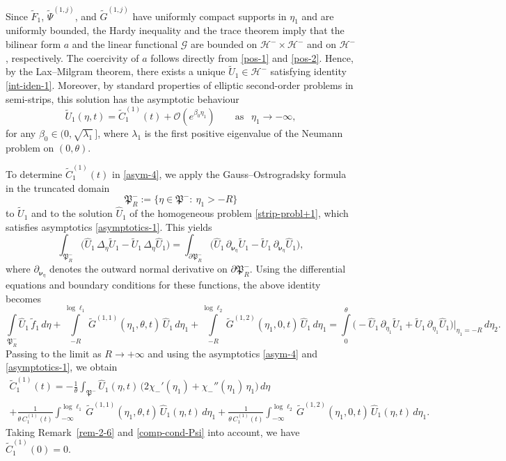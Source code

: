 \documentclass[reqno]{amsart}            %
\numberwithin{equation}{section}
\begin{document}
	Since $\widetilde{F}_1$, $\widetilde{\Psi}^{(1,j)}$, and $\widetilde{G}^{(1,j)}$ have uniformly compact supports in $\eta_1$ and are uniformly bounded, the Hardy inequality and the trace theorem imply that 
	the bilinear form $a$ and the linear functional $\mathcal{G}$ are bounded on $\mathcal{H}^- \times \mathcal{H}^-$ and on $\mathcal{H}^-$, respectively.
	The coercivity of $a$ follows directly from \eqref{pos-1} and \eqref{pos-2}. Hence, by the Lax--Milgram theorem, there exists a unique
	$\widetilde{U}_1 \in \mathcal{H}^-$ satisfying identity \eqref{int-iden-1}. 
	Moreover, by standard properties of elliptic second-order problems in semi-strips, this solution has the asymptotic behaviour
	\begin{equation}\label{asym-4}
		\widetilde{U}_1(\eta,t) = \widetilde{C}^{(1)}_1(t) + \mathcal{O}\!\left(e^{\beta_0 \eta_1}\right)
		\qquad \text{as } \ \ \eta_1 \to -\infty,
	\end{equation}
	for any $\beta_0 \in (0,\sqrt{\lambda_1}\,]$, where $\lambda_1$ is the first positive eigenvalue of the Neumann problem on $(0,\theta)$.
	
	To determine $\widetilde{C}^{(1)}_1(t)$ in \eqref{asym-4}, we apply the Gauss--Ostrogradsky formula in the truncated domain
	$$
	\mathfrak{P}^-_R := \{\eta \in \mathfrak{P}^-\colon \ \eta_1 > - R\}
	$$ 
	to $\widetilde{U}_1$ and to the solution $\widehat{U}_1$ of the homogeneous problem \eqref{strip-probl+1}, which satisfies asymptotics \eqref{asymptotics-1}. This yields
	$$
	\int_{\mathfrak{P}^-_R}\Big(\widehat{U}_1 \, \Delta_\eta\widetilde{U}_1 - \widetilde{U}_1 \, \Delta_\eta\widehat{U}_1\Big) =
	\int_{\partial\mathfrak{P}^-_R}\Big(\widehat{U}_1 \, \partial_{\boldsymbol{\nu}_\eta}\widetilde{U}_1 - \widetilde{U}_1 \, \partial_{\boldsymbol{\nu}_\eta}\widehat{U}_1\Big),
	$$ 
	where $\partial_{\boldsymbol{\nu}_\eta}$ denotes the outward normal derivative on $\partial\mathfrak{P}^-_R$. 
	Using the differential equations and boundary conditions for these functions, the above identity becomes
	$$
	\int\limits_{\mathfrak{P}^-_R} \widehat{U}_1 \, \tilde{f}_1 \, d\eta + \int\limits_{-R}^{\log\ell_1} \widetilde{G}^{(1,1)}(\eta_1,\theta,t) \,  \widehat{U}_1 \, d\eta_1 + \int\limits_{-R}^{\log\ell_2} \widetilde{G}^{(1,2)}(\eta_1,0,t) \,  \widehat{U}_1\, d\eta_1 =
	\int\limits_{0}^{\theta}\Big(-\widehat{U}_1 \, \partial_{\eta_1}\widetilde{U}_1 + \widetilde{U}_1 \, \partial_{\eta_1}\widehat{U}_1\Big)\Big|_{\eta_1=-R} \, d\eta_2.
	$$
	Passing to the limit as $R\to+\infty$ and using the asymptotics \eqref{asym-4} and \eqref{asymptotics-1}, we obtain
	\begin{multline}\label{constant}
		\widetilde{C}^{(1)}_1(t) = -\frac{1}{\theta} \int_{\mathfrak{P}^-} \widehat{U}_1(\eta,t) \, \big(2\chi_-'(\eta_1) + \chi_-''(\eta_1)\,\eta_1\big)\, d\eta 
		\\
		+ \frac{1}{\theta\, C_1^{(1)}(t)}\int_{-\infty}^{\log\ell_1} \widetilde{G}^{(1,1)}(\eta_1,\theta,t) \,  \widehat{U}_1(\eta,t) \, d\eta_1 + \frac{1}{\theta\, C_1^{(1)}(t)}\int_{-\infty}^{\log\ell_2} \widetilde{G}^{(1,2)}(\eta_1,0,t) \,  \widehat{U}_1(\eta,t)\, d\eta_1.
	\end{multline}
	Taking Remark~\ref{rem-2-6} and \eqref{comp-cond-Psi} 
	into account, we have $\widetilde{C}^{(1)}_1(0) =0.$
	
\end{document}

